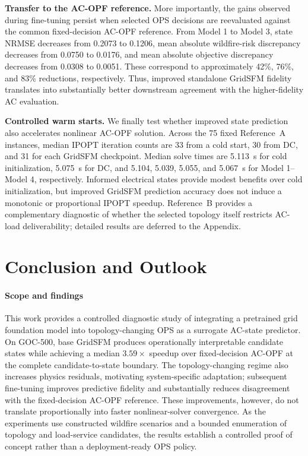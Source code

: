 \documentclass{article}
\begin{document}
\noindent\textbf{Transfer to the AC-OPF reference.}\enspace
More importantly, the gains observed during fine-tuning persist when selected
OPS decisions are reevaluated against the common fixed-decision AC-OPF
reference. From Model 1 to Model 3, state NRMSE decreases from 0.2073 to
0.1206, mean absolute wildfire-risk discrepancy decreases from 0.0750 to
0.0176, and mean absolute objective discrepancy decreases from 0.0308 to
0.0051. These correspond to approximately 42\%, 76\%, and 83\% reductions,
respectively. Thus, improved standalone GridSFM fidelity translates into
substantially better downstream agreement with the higher-fidelity AC
evaluation.

\noindent\textbf{Controlled warm starts.}\enspace
We finally test whether improved state prediction also accelerates nonlinear
AC-OPF solution. Across the 75 fixed Reference~A instances, median IPOPT
iteration counts are 33 from a cold start, 30 from DC, and 31 for each GridSFM
checkpoint. Median solve times are 5.113~s for cold initialization, 5.075~s
for DC, and 5.104, 5.039, 5.055, and 5.067~s for Model 1--Model 4,
respectively. Informed electrical states provide modest benefits over cold
initialization, but improved GridSFM prediction accuracy does not induce a
monotonic or proportional IPOPT speedup. Reference~B provides a complementary
diagnostic of whether the selected topology itself restricts AC-load
deliverability; detailed results are deferred to the Appendix.

\section{Conclusion and Outlook}

\paragraph{Scope and findings}
This work provides a controlled diagnostic study of integrating a pretrained
grid foundation model into topology-changing OPS as a surrogate AC-state
predictor. On GOC-500, base GridSFM produces operationally interpretable
candidate states while achieving a median $3.59\times$ speedup over
fixed-decision AC-OPF at the complete candidate-to-state boundary. The
topology-changing regime also increases physics residuals, motivating
system-specific adaptation; subsequent fine-tuning improves predictive fidelity
and substantially reduces disagreement with the fixed-decision AC-OPF
reference. These improvements, however, do not translate proportionally into
faster nonlinear-solver convergence. As the experiments use constructed
wildfire scenarios and a bounded enumeration of topology and load-service
candidates, the results establish a controlled proof of concept rather than a
deployment-ready OPS policy.
\end{document}

